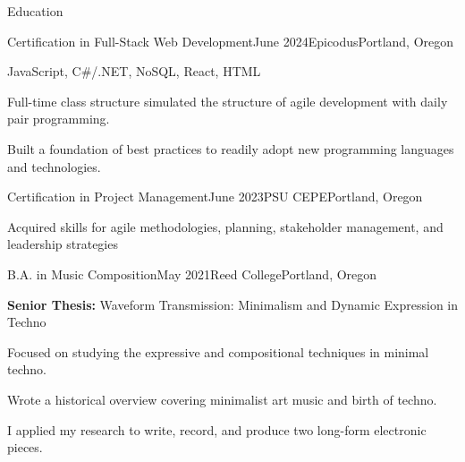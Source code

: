 \documentclass[
	11pt, %
]{resume} %
\begin{document}
\begin{rSection}{Education}
	
	\begin{rSubsection}{Certification in Full-Stack Web Development}{June 2024}{Epicodus}{Portland, Oregon}
		\item JavaScript, C\#/.NET, NoSQL, React, HTML
		\item Full-time class structure simulated the structure of agile development with daily pair programming.
		\item Built a foundation of best practices to readily adopt new programming languages and technologies.
	\end{rSubsection}
	\begin{rSubsection}{Certification in Project Management}{June 2023}{PSU CEPE}{Portland, Oregon}
		\item Acquired skills for agile methodologies, planning, stakeholder management, and leadership strategies
	\end{rSubsection}
	\begin{rSubsection}{B.A. in Music Composition}{May 2021}{Reed College}{Portland, Oregon}
		\item \textbf{Senior Thesis:} Waveform Transmission: Minimalism and Dynamic Expression in Techno
		\item Focused on studying the expressive and compositional techniques in minimal techno.
		\item Wrote a historical overview covering minimalist art music and birth of techno.
		\item I applied my research to write, record, and produce two long-form electronic pieces.
	\end{rSubsection}

	
\end{rSection}

\end{document}
